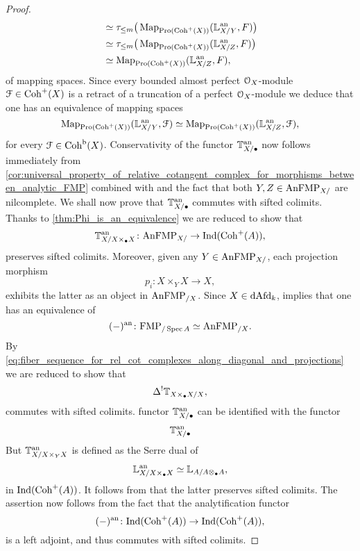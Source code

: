 \documentclass[10pt,a4paper,reqno]{amsart} %
\theoremstyle{plain}
\theoremstyle{definition}
\theoremstyle{remark}
\numberwithin{equation}{section}
\begin{document}
\begin{proof}
\begin{align*}
                                                                   & \simeq \tau_{\le m} \big( \operatorname{Map}_{\mathrm{Pro}(\mathrm{Coh}^+(X))}(\mathbb L^\mathrm{an}_{X/Y}, F) \big) \\
                                                                   & \simeq \tau_{\le m} \big( \operatorname{Map}_{\mathrm{Pro}(\mathrm{Coh}^+(X))}(\mathbb L^\mathrm{an}_{X/Z}, F) \big) \\
                                                                   & \simeq \operatorname{Map}_{\mathrm{Pro}(\mathrm{Coh}^+(X))}(\mathbb L^\mathrm{an}_{X/Z}, F),
        \end{align*}
    of mapping spaces. Since every bounded almost perfect $\mathcal O_X$-module $\mathcal F \in \mathrm{Coh}^+(X)$ is a retract of a truncation of a perfect $\mathcal O_X$-module we deduce that
    one has an equivalence of mapping spaces
        \[
            \operatorname{Map}_{\mathrm{Pro}(\mathrm{Coh}^+(X))}(\mathbb L^\mathrm{an}_{X/ Y}, \mathcal F) \simeq \operatorname{Map}_{\mathrm{Pro}(\mathrm{Coh}^+(X))}(\mathbb L^\mathrm{an}_{X/Z}, \mathcal F),
        \]
    for every $\mathcal F \in \mathrm{Coh}^\mathrm{b}(X)$. Conservativity of the functor $\mathbb T^\mathrm{an}_{X/ \bullet}$ now follows immediately from \cref{cor:universal_property_of_relative_cotangent_complex_for_morphisms_between_analytic_FMP}
    combined with \cite[Corollary 5.40]{Porta_Yu_Representability} and the fact that both $Y, Z \in \mathrm{AnFMP}_{X/}$ are nilcomplete.
    We shall now prove that $\mathbb T^\mathrm{an}_{X/ \bullet}$ commutes with sifted colimits.
    Thanks to \cref{thm:Phi_is_an_equivalence} we are reduced to show that
        \[
            \mathbb T^\mathrm{an}_{X/ X \times_\bullet X} \colon \mathrm{AnFMP}_{X/} \to \mathrm{Ind}(\mathrm{Coh}^+(A)),  
        \]
    preserves sifted colimits. Moreover, given any $Y \in \mathrm{AnFMP}_{X/}$, each projection morphism
        \[
            p_i \colon X \times_Y X \to X,  
        \]
    exhibits the latter as an object in $\mathrm{AnFMP}_{/X}$. Since $X \in \mathrm{dAfd}_k$, \cite[Theorem 6.12]{Porta_Yu_NQK} implies that one has an equivalence of \infcats
        \[
            (-)^\mathrm{an} \colon \mathrm{FMP}_{/\operatorname{Spec} A} \simeq \mathrm{AnFMP}_{/X} .
        \]
    By \eqref{eq:fiber_sequence_for_rel_cot_complexes_along_diagonal_and_projections} we are reduced to show that
        \[
            \Delta^! \mathbb T_{X \times_{\bullet} X/ X}  ,  
        \]
    commutes with sifted colimits. functor $\mathbb T^\mathrm{an}_{X/ \bullet}$ can be identified with the functor
        \[
            \mathbb T^\mathrm{an}_{X/ \bullet}  
        \]
    But $\mathbb T^\mathrm{an}_{X/ X \times_Y X}$ is defined as the Serre dual of
        \[
            \mathbb L^\mathrm{an}_{X/ X\times_\bullet X } \simeq \mathbb L_{A/ A \otimes_\bullet A},  
        \]
    in $\mathrm{Ind}(\mathrm{Coh}^+(A))$. It follows from \cite[\S 5, Corollary 2.2.4]{Gaitsgory_Study_II} that the latter preserves sifted colimits. The assertion
    now follows from the fact that the analytification functor
        \[
            (-)^\mathrm{an} \colon \mathrm{Ind}(\mathrm{Coh}^+(A)) \to \mathrm{Ind}(\mathrm{Coh}^+(A)),
        \]
    is a left adjoint, and thus commutes with sifted colimits.
\end{proof}
\end{document}
